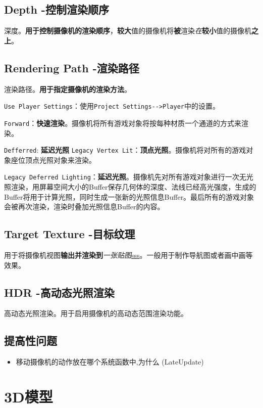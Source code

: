 \documentclass[UTF8,a4paper,12pt]{ctexbook}
\begin{document}
		\subsection{Depth -控制渲染顺序}
			深度。\textbf{用于控制摄像机的渲染顺序}，\textbf{较大}值的摄像机将\textbf{被}渲染\textit{在}\textbf{较小}值的摄像机\textbf{之上}。
			
		\subsection{Rendering Path -渲染路径}
			渲染路径。\textbf{用于指定摄像机的渲染方法}。
			
			\verb|Use Player Settings|：使用\verb|Project Settings-->Player|中的设置。
			
			\verb|Forward|：\textbf{快速渲染}。摄像机将所有游戏对象将按每种材质一个通道的方式来渲染。
			
			\verb|Defferred|: \textbf{延迟光照}
			\verb|Legacy Vertex Lit|：\textbf{顶点光照}。摄像机将对所有的游戏对象座位顶点光照对象来渲染。
			
			\verb|Legacy Deferred Lighting|：\textbf{延迟光照}。摄像机先对所有游戏对象进行一次无光照渲染，用屏幕空间大小的Buffer保存几何体的深度、法线已经高光强度，生成的Buffer将用于计算光照，同时生成一张新的光照信息Buffer。最后所有的游戏对象会被再次渲染，渲染时叠加光照信息Buffer的内容。
			
		\subsection{Target Texture -目标纹理}
			用于将摄像机视图\textbf{输出并渲染到}\textit{一张贴图}\underline{sss}。一般用于制作导航图或者画中画等效果。
			
		\subsection{HDR -高动态光照渲染}
			高动态光照渲染。用于启用摄像机的高动态范围渲染功能。
	
		\subsection{提高性问题}
			\begin{itemize}
				\item 移动摄像机的动作放在哪个系统函数中,为什么 (LateUpdate)
			\end{itemize}

	\section{3D模型}
\end{document}
